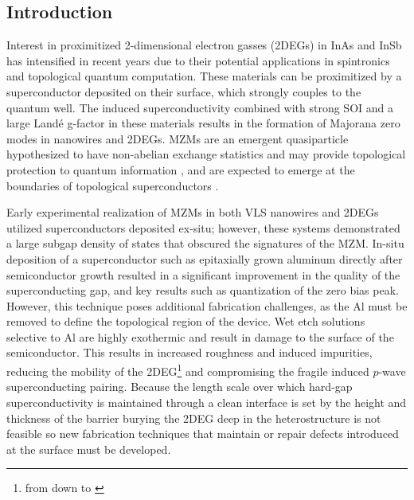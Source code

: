 \subsection{\label{sec:surf_intro}Introduction}

Interest in proximitized 2-dimensional electron gasses (2DEGs) in InAs and InSb has intensified in recent years due to their potential applications in spintronics\cite{spintronics} and topological quantum computation\cite{PhysRevLett.105.077001,s41578-018-0003-1}. These materials can be proximitized by a superconductor deposited on their surface, which strongly couples to the quantum well. The induced superconductivity combined with strong SOI and a large Land\'e g-factor in these materials results in the formation of Majorana zero modes in  nanowires\cite{Mourik1003,AlbretchNature} and 2DEGs\cite{PhysRevLett.119.136803,PhysRevLett.119.176805}. MZMs are an emergent quasiparticle hypothesized to have non-abelian exchange statistics and may provide topological protection to quantum information \cite{RevModPhys.80.1083}, and are expected to emerge at the boundaries of topological superconductors \cite{RevModPhys.83.1057,Kitaev_2001,doi:10.1146/030212-184337}.

Early experimental realization of MZMs in both VLS nanowires and 2DEGs utilized superconductors deposited ex-situ; however, these systems demonstrated a large subgap density of states that obscured the signatures of the MZM. In-situ deposition of a superconductor such as epitaxially grown aluminum directly after semiconductor growth resulted in a significant improvement in the quality of the superconducting gap\cite{nnano.2014.306,hard_gap_2deg}, and key results such as quantization of the zero bias peak. However, this technique poses additional fabrication challenges, as the Al must be removed to define the topological region of the device. Wet etch solutions selective to Al are highly exothermic and result in damage to the surface of the semiconductor. This results in increased roughness and induced impurities, reducing the mobility of the 2DEG\footnote{from \cite{shabani_transport} down to \cite{hard_gap_2deg,PhysRevLett.115.127001}} and compromising the fragile induced $p$-wave superconducting pairing\cite{PhysRevB.83.184520,PhysRevB.85.140513}. Because the length scale over which hard-gap superconductivity is maintained through a clean interface is set by the height and thickness of the barrier\cite{PhysRevLett.110.186803} burying the 2DEG deep in the heterostructure is not feasible\cite{PhysRevB.93.155402} so new fabrication techniques that maintain or repair defects introduced at the surface must be developed.

